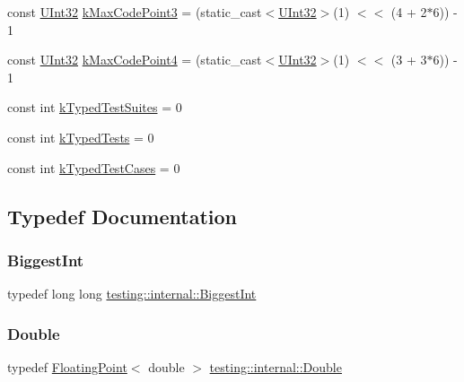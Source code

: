 \begin{DoxyCompactItemize}
\item 
const \mbox{\hyperlink{namespacetesting_1_1internal_a436defbb8e92c8e94e33ebcc86f278ba}{U\+Int32}} \mbox{\hyperlink{namespacetesting_1_1internal_aa42bd507418e570402996e33582beed3}{k\+Max\+Code\+Point3}} = (static\+\_\+cast$<$\mbox{\hyperlink{namespacetesting_1_1internal_a436defbb8e92c8e94e33ebcc86f278ba}{U\+Int32}}$>$(1) $<$$<$ (4 + 2$\ast$6)) -\/ 1
\item 
const \mbox{\hyperlink{namespacetesting_1_1internal_a436defbb8e92c8e94e33ebcc86f278ba}{U\+Int32}} \mbox{\hyperlink{namespacetesting_1_1internal_acd87c60be9b5fedb2d017503d8834474}{k\+Max\+Code\+Point4}} = (static\+\_\+cast$<$\mbox{\hyperlink{namespacetesting_1_1internal_a436defbb8e92c8e94e33ebcc86f278ba}{U\+Int32}}$>$(1) $<$$<$ (3 + 3$\ast$6)) -\/ 1
\item 
const int \mbox{\hyperlink{namespacetesting_1_1internal_a92b49076a2183a2796d2772315839f6a}{k\+Typed\+Test\+Suites}} = 0
\item 
const int \mbox{\hyperlink{namespacetesting_1_1internal_a53ee2d113744f9ba1d89469db4d7388b}{k\+Typed\+Tests}} = 0
\item 
const int \mbox{\hyperlink{namespacetesting_1_1internal_a685ea5332074ae63b0ded2b184ac2271}{k\+Typed\+Test\+Cases}} = 0
\end{DoxyCompactItemize}


\subsection{Typedef Documentation}
\mbox{\label{namespacetesting_1_1internal_a05c6bd9ede5ccdf25191a590d610dcc6}} 
\subsubsection{\texorpdfstring{BiggestInt}{BiggestInt}}
{\footnotesize\ttfamily typedef long long \mbox{\hyperlink{namespacetesting_1_1internal_a05c6bd9ede5ccdf25191a590d610dcc6}{testing\+::internal\+::\+Biggest\+Int}}}

\mbox{\label{namespacetesting_1_1internal_a92debc9f055b7e7e1e4e861c5ae1c67a}} 
\subsubsection{\texorpdfstring{Double}{Double}}
{\footnotesize\ttfamily typedef \mbox{\hyperlink{classtesting_1_1internal_1_1_floating_point}{Floating\+Point}}$<$ double $>$ \mbox{\hyperlink{namespacetesting_1_1internal_a92debc9f055b7e7e1e4e861c5ae1c67a}{testing\+::internal\+::\+Double}}}

